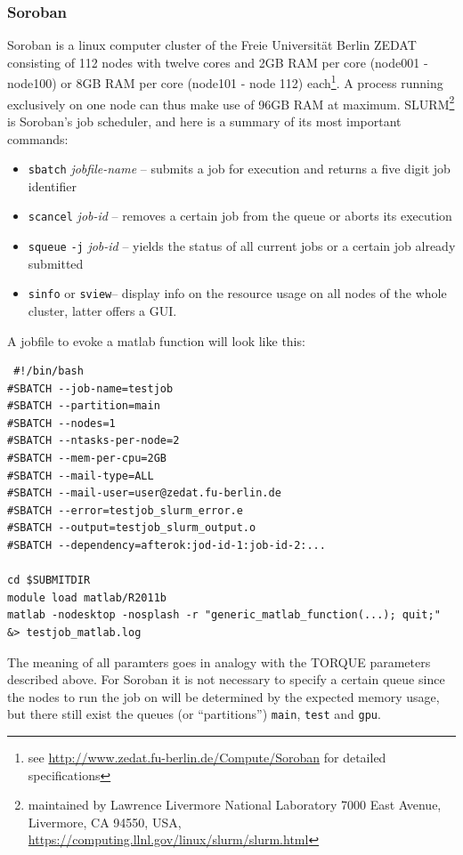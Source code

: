 \documentclass[11.5pt,a4paper]{article}
\begin{document}
\subsubsection{Soroban}
\label{sec-soroban}
Soroban is a linux computer cluster of the Freie Universit\"at Berlin ZEDAT consisting of 112 nodes with twelve cores and 2GB RAM per core (node001 - node100) or 8GB RAM per core (node101 - node 112) each\footnote{see \url{http://www.zedat.fu-berlin.de/Compute/Soroban} for detailed specifications}. A process running exclusively on one node can thus make use of 96GB RAM at maximum. SLURM\footnote{maintained by Lawrence Livermore National Laboratory 7000 East Avenue, Livermore, CA 94550, USA, \url{https://computing.llnl.gov/linux/slurm/slurm.html}} is Soroban's job scheduler, and here is a summary of its most important commands:
\begin{itemize}
 \item \verb$sbatch$ \emph{jobfile-name} -- submits a job for execution and returns a five digit job identifier
  \item \verb$scancel$ \emph{job-id} -- removes a certain job from the queue or aborts its execution
  \item \verb$squeue$ {\verb$-j$ \emph{job-id}} -- yields the status of all current jobs {or a certain job already submitted}
  \item \verb$sinfo$ or \verb$sview$-- display info on the resource usage on all nodes of the whole cluster, latter offers a GUI.
\end{itemize}
A jobfile to evoke a matlab function will look like this:
\begin{lstlisting}
 #!/bin/bash 
#SBATCH --job-name=testjob
#SBATCH --partition=main
#SBATCH --nodes=1 
#SBATCH --ntasks-per-node=2 
#SBATCH --mem-per-cpu=2GB
#SBATCH --mail-type=ALL
#SBATCH --mail-user=user@zedat.fu-berlin.de 
#SBATCH --error=testjob_slurm_error.e
#SBATCH --output=testjob_slurm_output.o 
#SBATCH --dependency=afterok:jod-id-1:job-id-2:...

cd $SUBMITDIR
module load matlab/R2011b
matlab -nodesktop -nosplash -r "generic_matlab_function(...); quit;" &> testjob_matlab.log                                                                                   
\end{lstlisting}
The meaning of all paramters goes in analogy with the TORQUE parameters described above. For Soroban it is not necessary to specify a certain queue since the nodes to run the job on will be determined by the expected memory usage, but there still exist the queues (or ``partitions'') \verb$main$, \verb$test$ and \verb$gpu$.
\end{document}
